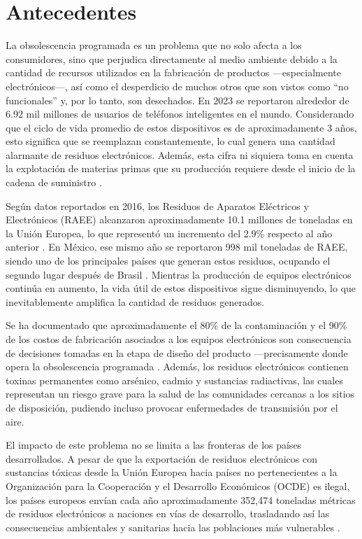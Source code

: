 \section{Antecedentes}

La obsolescencia programada es un problema que no solo afecta a los
consumidores, sino que perjudica directamente al medio ambiente debido a la
cantidad de recursos utilizados en la fabricación de productos —especialmente
electrónicos—, así como el desperdicio de muchos otros que son vistos como ``no
funcionales'' y, por lo tanto, son desechados. En 2023 se reportaron alrededor
de 6.92 mil millones de usuarios de teléfonos inteligentes en el mundo.
Considerando que el ciclo de vida promedio de estos dispositivos es de
aproximadamente 3 años, esto significa que se reemplazan constantemente, lo cual
genera una cantidad alarmante de residuos electrónicos. Además, esta cifra ni
siquiera toma en cuenta la explotación de materias primas que su producción
requiere desde el inicio de la cadena de suministro \parencite[p.~220]{ozturkcan2023}.

Según datos reportados en 2016, los Residuos de Aparatos Eléctricos y
Electrónicos (RAEE) alcanzaron aproximadamente 10.1 millones de toneladas en la
Unión Europea, lo que representó un incremento del 2.9\% respecto al año
anterior \parencite[p.~728]{malinauskaite2021}. En México, ese mismo año se
reportaron 998 mil toneladas de RAEE, siendo uno de los principales países que
generan estos residuos, ocupando el segundo lugar después de Brasil
\parencite[p.~207]{munoz2023}. Mientras la producción de equipos electrónicos
continúa en aumento, la vida útil de estos dispositivos sigue disminuyendo, lo
que inevitablemente amplifica la cantidad de residuos generados.

Se ha documentado que aproximadamente el 80\% de la contaminación y el 90\% de
los costos de fabricación asociados a los equipos electrónicos son consecuencia
de decisiones tomadas en la etapa de diseño del producto —precisamente donde
opera la obsolescencia programada \parencite[p.~728]{malinauskaite2021}. Además,
los residuos electrónicos contienen toxinas permanentes como arsénico, cadmio y
sustancias radiactivas, las cuales representan un riesgo grave para la salud de
las comunidades cercanas a los sitios de disposición, pudiendo incluso provocar
enfermedades de transmisión por el aire.

El impacto de este problema no se limita a las fronteras de los países
desarrollados. A pesar de que la exportación de residuos electrónicos con
sustancias tóxicas desde la Unión Europea hacia países no pertenecientes a la
Organización para la Cooperación y el Desarrollo Económicos (OCDE) es ilegal,
los países europeos envían cada año aproximadamente 352,474 toneladas métricas
de residuos electrónicos a naciones en vías de desarrollo, trasladando así las
consecuencias ambientales y sanitarias hacia las poblaciones más vulnerables
\parencite[p.~728]{malinauskaite2021}.

